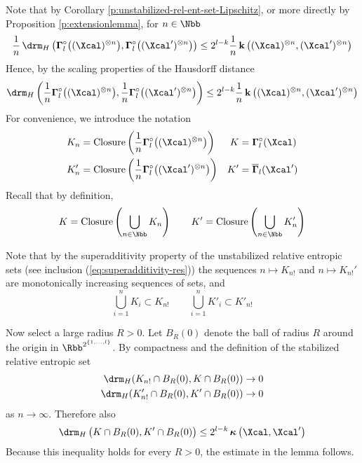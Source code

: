 \begin{Proof}
  Note that by Corollary \ref{p:unstabilized-rel-ent-set-Lipschitz},
  or more directly by Proposition \ref{p:extensionlemma}, for $n \in
  \Nbb$
  \[
  \frac1n \d_H 
  \left(
    \res_l\big((\Xcal)^{\otimes n}\big), 
    \res_l \big((\Xcal')^{\otimes n}\big)
  \right)
  \leq 
  2^{l-k}\frac1n \ikd \big( (\Xcal)^{\otimes n}, (\Xcal')^{\otimes n} \big)
  \]	
  Hence, by the scaling properties of the Hausdorff distance
  \[
  \d_H 
  \left(
    \frac{1}{n}\res_l\big((\Xcal)^{\otimes n}\big), 
    \frac{1}{n}\res_l \big((\Xcal')^{\otimes n}\big)
  \right)
  \leq 
  2^{l-k} \frac1n \ikd \big( (\Xcal)^{\otimes n}, (\Xcal')^{\otimes n} \big)
  \]
  For convenience, we introduce the notation
  \begin{align*}
    K_n 
    &= 
    \closure\left( \frac{1}{n}\res_l\big((\Xcal)^{\otimes n}\big) \right) 
    & 
    K
    &= 
    \res_l(\Xcal) 
    \\
    K_n' 
    &= 
    \closure
    \left( 
       \frac{1}{n}\res_l\big((\Xcal')^{\otimes n}\big) 
    \right) 
    &
    K'
    &= 
    \sres_l(\Xcal')
  \end{align*}
  Recall that by definition,
  \[
  K 
  = 
  \closure \left(\bigcup_{n \in \Nbb} K_n\right) 
  \qquad 
  K'  
  = 
  \closure \left( \bigcup_{n \in \Nbb} K_n'\right)
  \]

  Note that by the superadditivity property of the unstabilized
  relative entropic sets (see inclusion
  (\ref{eq:superadditivity-res})) the sequences $n \mapsto K_{n!}$ and
  $n \mapsto K_{n!}'$ are monotonically increasing sequences of sets,
  and
  \[
  \bigcup_{i =1}^n K_i \subset K_{n!} 
  \qquad 
  \bigcup_{i =1}^n K'_i \subset K'_{n!}
  \]

  Now select a large radius $R > 0$. Let $B_R(0)$ denote the ball of
  radius $R$ around the origin in $\Rbb^{2^{\{1,\ldots,l\}}}$.  By
  compactness and the definition of the stabilized relative entropic
  set
  \begin{align*}
    \d_H( K_{n!} \cap B_R(0) , K \cap B_R(0) ) 
    &\to 
    0
    \\
    \d_H( K_{n!}' \cap B_R(0), K' \cap B_R(0) ) 
    & \to 
    0
  \end{align*}
  as $n \to \infty$. Therefore also
  \[
  \d_H
  \big( 
    K \cap B_R(0) , 
    K' \cap B_R(0) 
  \big) 
  \leq 
  2^{l-k} \aikd\big( \Xcal, \Xcal' \big)
  \]
  Because this inequality holds for every $R>0$, the estimate in the
  lemma follows.
\end{Proof}


